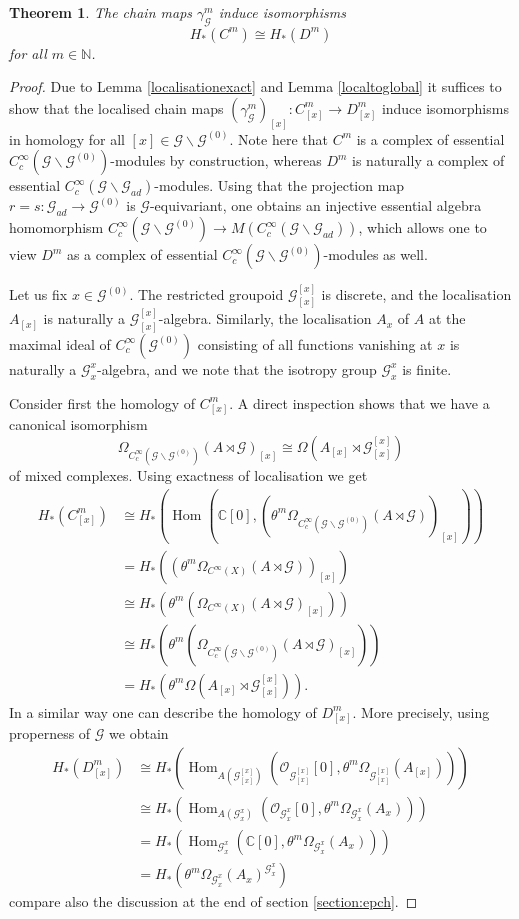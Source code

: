 \documentclass{amsart}
\newtheorem{thm}{Theorem}[section]
\newcommand{\G}{\mathcal{G}}
\renewcommand{\O}{\mathcal{O}}
\newcommand{\ccinfty}{C_c^\infty}
\newcommand{\cinfty}{C^\infty}
\DeclareMathOperator{\Hom}{Hom}
\begin{document}
\begin{thm} \label{Green-Julg-local}
The chain maps $ \gamma^m_\G $ induce isomorphisms 
$$
H_*(C^m) \cong H_*(D^m)
$$
for all $ m \in \mathbb{N} $. 
\end{thm}

\begin{proof} 
Due to Lemma \ref{localisationexact} and Lemma \ref{localtoglobal} it suffices to show that the localised chain maps $ (\gamma_\G^m)_{[x]}: C^m_{[x]} \rightarrow D^m_{[x]} $ induce isomorphisms in homology for all $ [x] \in \G\backslash\G^{(0)} $. Note here that $ C^m $ is a complex of essential $ \ccinfty(\G \backslash \G^{(0)}) $-modules by construction, whereas $ D^m $ is naturally a complex of essential $ \ccinfty(\G\backslash\G_{ad}) $-modules. Using that the projection map $ r = s: \G_{ad} \rightarrow \G^{(0)} $ is $ \G $-equivariant, one obtains an injective essential algebra homomorphism $ \ccinfty(\G\backslash\G^{(0)}) \rightarrow M(\ccinfty(\G\backslash\G_{ad})) $, which allows one to view $ D^m $ as a complex of essential  $ \ccinfty(\G \backslash \G^{(0)}) $-modules as well. 

Let us fix $ x \in \G^{(0)} $. 
The restricted groupoid $ \G^{[x]}_{[x]} $ is discrete, and the localisation $ A_{[x]} $ is naturally a $ \G^{[x]}_{[x]} $-algebra. Similarly, the localisation $ A_x $ 
of $ A $ at the maximal ideal of $ \ccinfty(\G^{(0)}) $ consisting of all functions vanishing at $ x $ is naturally a $ \G^x_x $-algebra, and we note that
the isotropy group $ \G^x_x $ is finite. 

Consider first the homology of $ C^m_{[x]} $. A direct inspection shows that we have a canonical isomorphism 
$$ 
\Omega_{\ccinfty(\G\backslash\G^{(0)})}(A \rtimes \G)_{[x]} \cong \Omega(A_{[x]} \rtimes \G_{[x]}^{[x]})
$$ 
of mixed complexes. 
Using exactness of localisation we get 
\begin{align*}
H_*(C^m_{[x]}) &\cong H_*(\Hom(\mathbb{C}[0], (\theta^m \Omega_{\ccinfty(\G\backslash\G^{(0)})}(A \rtimes \G))_{[x]})) \\
&= H_*((\theta^m \Omega_{\cinfty(X)}(A \rtimes \G))_{[x]}) \\
&\cong H_*(\theta^m(\Omega_{\cinfty(X)}(A \rtimes \G)_{[x]})) \\
&\cong H_*(\theta^m(\Omega_{\ccinfty(\G \backslash \G^{(0)})}(A \rtimes \G)_{[x]})) \\
&= H_*(\theta^m \Omega(A_{[x]} \rtimes \G^{[x]}_{[x]})). 
\end{align*}
In a similar way one can describe the homology of $ D^m_{[x]} $. More precisely, using properness of $ \G $ we obtain
\begin{align*}
H_*(D^m_{[x]}) &\cong H_*(\Hom_{A(\G_{[x]}^{[x]})}(\O_{\G^{[x]}_{[x]}}[0], \theta^m \Omega_{\G^{[x]}_{[x]}}(A_{[x]}))) \\
&\cong H_*(\Hom_{A(\G_x^x)}(\O_{\G_x^x}[0], \theta^m \Omega_{\G^x_x}(A_x))) \\ 
&= H_*(\Hom_{\G_x^x}(\mathbb{C}[0], \theta^m \Omega_{\G^x_x}(A_x))) \\ 
&= H_*(\theta^m \Omega_{\G^x_x}(A_x)^{\G_x^x}) 
\end{align*}
compare also the discussion at the end of section \ref{section:epch}. 


\end{proof}
\end{document}
